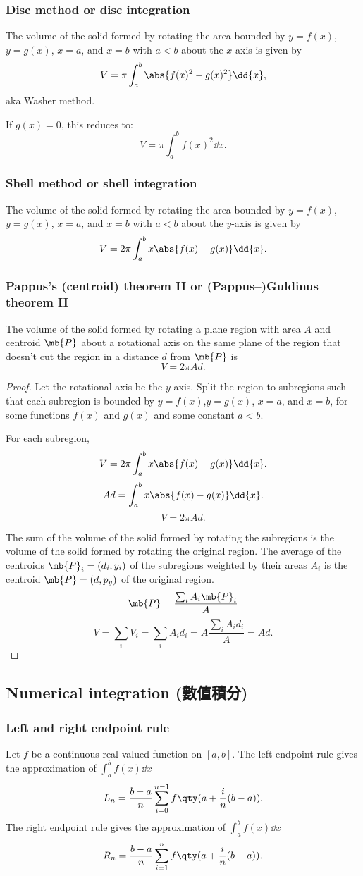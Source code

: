 \documentclass[a4paper,12pt]{report}
\begin{document}
\begin{itemize}
\begin{itemize}
\subsubsection{Disc method or disc integration}
The volume of the solid formed by rotating the area bounded by $y=f(x)$,$y=g(x)$, $x=a$, and $x=b$ with $a<b$ about the $x$-axis is given by 
\[V=\pi\int_a^b\abs{f(x)^2-g(x)^2}\dd{x},\]
aka Washer method.

If $g(x)=0$, this reduces to: 
\[V=\pi\int_a^bf(x)^2\dd{x}.\]
\subsubsection{Shell method or shell integration}
The volume of the solid formed by rotating the area bounded by $y=f(x)$,$y=g(x)$, $x=a$, and $x=b$ with $a<b$ about the $y$-axis is given by 
\[V=2\pi\int_a^bx\abs{f(x)-g(x)}\dd{x}.\]
\subsubsection{Pappus's (centroid) theorem II or (Pappus–)Guldinus theorem II}
The volume of the solid formed by rotating a plane region with area $A$ and centroid $\mb{P}$ about a rotational axis on the same plane of the region that doesn't cut the region in a distance $d$ from $\mb{P}$ is
\[V=2\pi Ad.\]
\begin{proof}
Let the rotational axis be the $y$-axis. Split the region to subregions such that each subregion is bounded by $y=f(x)$,$y=g(x)$, $x=a$, and $x=b$, for some functions $f(x)$ and $g(x)$ and some constant $a<b$.

For each subregion,
\[V=2\pi\int_a^bx\abs{f(x)-g(x)}\dd{x}.\]
\[Ad=\int_a^bx\abs{f(x)-g(x)}\dd{x}.\]
\[V=2\pi Ad.\]

The sum of the volume of the solid formed by rotating the subregions is the volume of the solid formed by rotating the original region. The average of the centroids $\mb{P}_i=(d_i,y_i)$ of the subregions weighted by their areas $A_i$ is the centroid $\mb{P}=(d,p_y)$ of the original region.
\[\mb{P}=\frac{\sum_iA_i\mb{P}_i}{A}\]
\[V=\sum_iV_i=\sum_iA_id_i=A\frac{\sum_iA_id_i}{A}=Ad.\]
\end{proof}
\subsection{Numerical integration (數值積分)}
\subsubsection{Left and right endpoint rule}
Let $f$ be a continuous real-valued function on $[a,b]$. The left endpoint rule gives the approximation of $\int_a^bf(x)\dd{x}$
\[L_n=\frac{b-a}{n}\sum_{i=0}^{n-1}f\qty(a+\frac{i}{n}(b-a)).\]
The right endpoint rule gives the approximation of $\int_a^bf(x)\dd{x}$
\[R_n=\frac{b-a}{n}\sum_{i=1}^nf\qty(a+\frac{i}{n}(b-a)).\]

\end{itemize}
\end{itemize}
\end{document}
